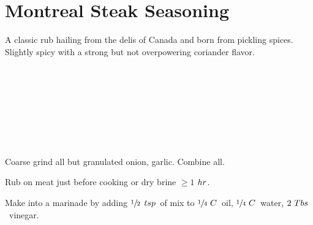 \section[Montreal Steak]{Montreal Steak Seasoning}

\begin{recipestats}[
        servings=5\onehalf~\Tablespoon,
        preptime=5~\minute,
        original=\citeauthor{spruceMontrealSteak}~\cite{spruceMontrealSteak},
    ]
\end{recipestats}

\begin{recipeabstract}
    A classic rub hailing from the delis of Canada and born from pickling spices.
    Slightly spicy with a strong but not overpowering coriander flavor.
\end{recipeabstract}

\begin{ingredientcolumns}
    \begin{ingredientblock}
        \\
        \\
        \\
    \end{ingredientblock}
    \begin{ingredientblock}
        \\
        \\
        \\
    \end{ingredientblock}
\end{ingredientcolumns}

\begin{preparation}
\item Coarse grind all but granulated onion, garlic. Combine all.
\item Rub on meat just before cooking or dry brine $\ge1$ $\hour$.
\end{preparation}

\begin{variation}
\item Make into a marinade by adding $\onehalf$ $\teaspoon$~of mix to $\onefourth~C$~oil,
    $\onefourth~C$~water, $2~\Tablespoon$~vinegar.
\end{variation}

\recipeend%
